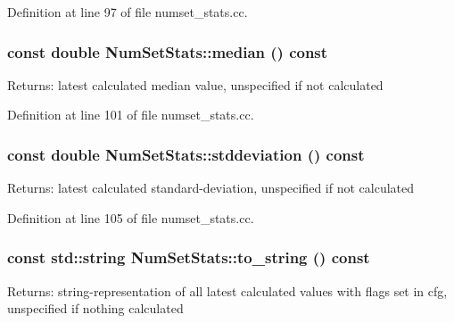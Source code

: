 Definition at line 97 of file numset\_\-stats.cc.\hypertarget{class_num_set_stats_09e5689d2b6635e1f7bf42cfb38d511c}{
\subsubsection[median]{\setlength{\rightskip}{0pt plus 5cm}const double NumSetStats::median () const}}
\label{class_num_set_stats_09e5689d2b6635e1f7bf42cfb38d511c}


\begin{Desc}
\item[Returns:]latest calculated median value, unspecified if not calculated \end{Desc}


Definition at line 101 of file numset\_\-stats.cc.\hypertarget{class_num_set_stats_e531b9144515a839e21b0a9c9c74daae}{
\subsubsection[stddeviation]{\setlength{\rightskip}{0pt plus 5cm}const double NumSetStats::stddeviation () const}}
\label{class_num_set_stats_e531b9144515a839e21b0a9c9c74daae}


\begin{Desc}
\item[Returns:]latest calculated standard-deviation, unspecified if not calculated \end{Desc}


Definition at line 105 of file numset\_\-stats.cc.\hypertarget{class_num_set_stats_639732de39c31d82ade97d8e204db3c0}{
\subsubsection[to\_\-string]{\setlength{\rightskip}{0pt plus 5cm}const std::string NumSetStats::to\_\-string () const}}
\label{class_num_set_stats_639732de39c31d82ade97d8e204db3c0}


\begin{Desc}
\item[Returns:]string-representation of all latest calculated values with flags set in cfg, unspecified if nothing calculated \end{Desc}


